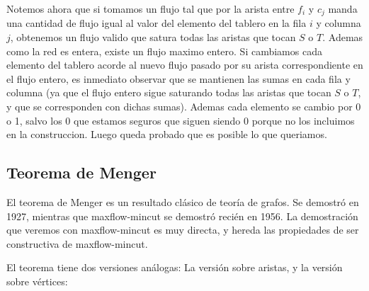 \documentclass{article}
\begin{document}
Notemos ahora que si tomamos un flujo tal que por la arista entre $f_i$ y $c_j$ manda una cantidad de flujo igual al valor del elemento
del tablero en la fila $i$ y columna $j$, obtenemos un flujo valido que satura todas las aristas que tocan $S$ o $T$. Ademas como la red es entera,
existe un flujo maximo entero. Si cambiamos cada elemento del tablero acorde al nuevo flujo pasado por su arista correspondiente en el flujo
entero, es inmediato observar que se mantienen las sumas en cada fila y columna (ya que el flujo entero sigue saturando todas las aristas
que tocan $S$ o $T$, y que se corresponden con dichas sumas). Ademas cada elemento se cambio por 0 o 1, salvo los 0 que estamos seguros que
siguen siendo 0 porque no los incluimos en la construccion. Luego queda probado que es posible lo que queriamos.


\subsection{Teorema de Menger}

El teorema de Menger es un resultado clásico de teoría de grafos. Se demostró en 1927, mientras que maxflow-mincut se demostró recién en 1956.
La demostración que veremos con maxflow-mincut es muy directa, y hereda las propiedades de ser constructiva de maxflow-mincut.

El teorema tiene dos versiones análogas: La versión sobre aristas, y la versión sobre vértices:
\end{document}
